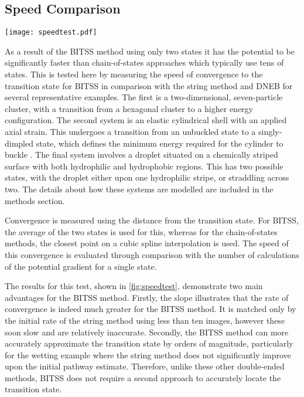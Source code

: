 \documentclass[twocolumn,10pt]{revtex4-2}
\begin{document}
\subsection{Speed Comparison}
\begin{figure*}[tb]
  \texttt{[image: speedtest.pdf]}
  \caption{\label{fig:speedtest}
    Comparisons between BITSS, DNEB, and the string method in the convergence to the transition state as a function of the number of calculations of the energy gradient.
    Three test systems are used: (a) a Lennard-Jones seven-particle cluster, (b) cylindrical shell buckling, and (c) wetting of a chemically-striped surface.
    The configurations shown correspond to the two minimum energy states and the transition state, marked by an asterisk.
    The string method and DNEB are repeated with a differing number of images, as listed in the legend in (c).
  }
\end{figure*}
As a result of the BITSS method using only two states it has the potential to be significantly faster than chain-of-states approaches which typically use tens of states.
This is tested here by measuring the speed of convergence to the transition state for BITSS in comparison with the string method and DNEB for several representative examples.
The first is a two-dimensional, seven-particle cluster, with a transition from a hexagonal cluster to a higher energy configuration.
The second system is an elastic cylindrical shell with an applied axial strain.
This undergoes a transition from an unbuckled state to a singly-dimpled state, which defines the minimum energy required for the cylinder to buckle \cite{Panter2019}.
The final system involves a droplet situated on a chemically striped surface with both hydrophilic and hydrophobic regions.
This has two possible states, with the droplet either upon one hydrophilic stripe, or straddling across two.
The details about how these systems are modelled are included in the methods section.

Convergence is measured using the distance from the transition state.
For BITSS, the average of the two states is used for this, whereas for the chain-of-states methods, the closest point on a cubic spline interpolation is used.
The speed of this convergence is evaluated through comparison with the number of calculations of the potential gradient for a single state.

The results for this test, shown in \cref{fig:speedtest}, demonstrate two main advantages for the BITSS method.
Firstly, the slope illustrates that the rate of convergence is indeed much greater for the BITSS method.
It is matched only by the initial rate of the string method using less than ten images, however these soon slow and are relatively inaccurate.
Secondly, the BITSS method can more accurately approximate the transition state by orders of magnitude, particularly for the wetting example where the string method does not significantly improve upon the initial pathway estimate.
Therefore, unlike these other double-ended methods, BITSS does not require a second approach to accurately locate the transition state.
\end{document}
